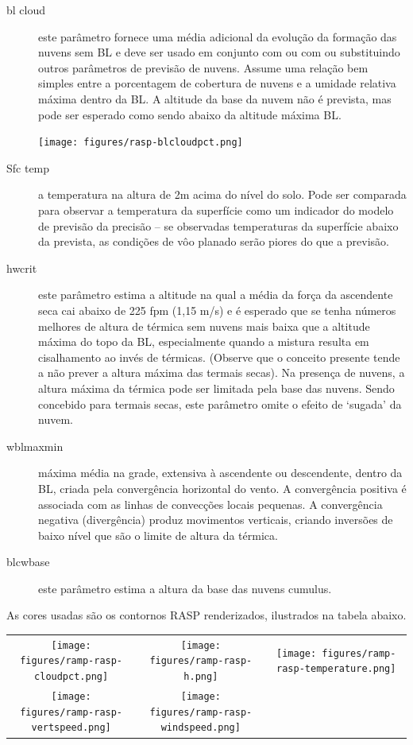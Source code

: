 \begin{description}
\item[bl cloud]  
este parâmetro fornece uma média adicional da evolução da formação das nuvens sem BL e deve ser usado em conjunto com ou com ou substituindo outros parâmetros de previsão de nuvens.  Assume uma relação bem simples entre a porcentagem de cobertura de nuvens e a umidade relativa máxima dentro da BL.  A altitude da base da nuvem não é prevista, mas pode ser esperado como sendo abaixo da altitude máxima BL.

\begin{center}
\texttt{[image: figures/rasp-blcloudpct.png]}
\end{center}

\item[Sfc temp] 
a temperatura na altura de 2m acima do nível do solo.  Pode ser comparada para observar a temperatura da superfície como um indicador do modelo de previsão da precisão – se observadas temperaturas da superfície abaixo da prevista, as condições de vôo planado serão piores do que a previsão.
\item[hwcrit]  
este parâmetro estima a altitude na qual a média da força da ascendente seca cai abaixo de 225 fpm (1,15 m/s) e é esperado que se tenha números melhores de altura de térmica sem nuvens mais baixa que a altitude máxima do topo da BL, especialmente quando a mistura resulta em cisalhamento ao invés de térmicas. (Observe que o conceito presente tende a não prever a altura máxima das termais secas).  Na presença de nuvens, a altura máxima da térmica pode ser limitada pela base das nuvens.  Sendo concebido para termais secas, este parâmetro omite o efeito de ‘sugada’ da nuvem.   
\item[wblmaxmin]  
máxima média na grade, extensiva à ascendente ou descendente, dentro da BL, criada pela convergência horizontal do vento.  A convergência positiva é associada com as linhas de convecções locais pequenas.  A convergência negativa (divergência) produz movimentos verticais, criando inversões de baixo nível que são o limite de altura da térmica.
\item[blcwbase] este parâmetro estima a altura da base das nuvens cumulus.  
\end{description}

\begin{maxipage}
As cores usadas são os contornos RASP renderizados, ilustrados na tabela abaixo.  

\begin{longtable}{c c c}
\texttt{[image: figures/ramp-rasp-cloudpct.png]}&

\texttt{[image: figures/ramp-rasp-h.png]}&

\texttt{[image: figures/ramp-rasp-temperature.png]}\\

\texttt{[image: figures/ramp-rasp-vertspeed.png]}&
\texttt{[image: figures/ramp-rasp-windspeed.png]}& \\

\end{longtable}
\end{maxipage}

